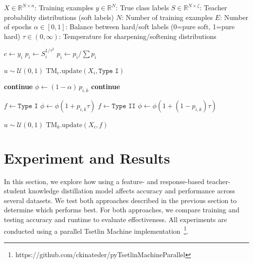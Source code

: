 \documentclass[sn-mathphys-num]{sn-jnl}%
\theoremstyle{thmstyleone}%
\theoremstyle{thmstyletwo}%
\theoremstyle{thmstylethree}%
\begin{document}
\begin{algorithm}[htbp]
	\caption{Tsetlin Machine fit method using soft label distributions}
	\label{algo:fit-soft}
	\begin{algorithmic}[1]
		\Require $X\in\mathbb{R}^{N \times n}$: Training examples
		\Require $y\in\mathbb{R}^{N}$: True class labels
		\Require $S\in\mathbb{R}^{N \times \zeta}$: Teacher probability distributions (soft labels)
		\Require $N$: Number of training examples
		\Require $E$: Number of epochs
		\Require $\alpha \in [0,1]$: Balance between hard/soft labels (0=pure soft, 1=pure hard)
		\Require $\tau \in (0,\infty)$: Temperature for sharpening/softening distributions
		
		\State $c \gets y_i$ 
		\State $p_i \gets S_i^{1/\tau^2}$ 
		\State $p_i \gets p_i / \sum p_i$ 
		
		\State $u \sim \mathcal{U}(0,1)$
		\State $\text{TM}_c.\text{update}(X_i, \texttt{Type I})$
		\EndIf
		
		\State \textbf{continue}
		\EndIf
		\State $\phi \gets (1 - \alpha) \, p_{i,k}$ 
		 
		\State \textbf{continue}
		\EndIf
		
		\State $f \gets \texttt{Type I}$ 
		\State $\phi \gets \phi (1 + p_{i,k} \tau)$
		\Else
		\State $f \gets \texttt{Type II}$ 
		\State $\phi \gets \phi (1 + (1 - p_{i,k}) \tau)$
		\EndIf
		
		\State $u \sim \mathcal{U}(0,1)$ 
		\State $\text{TM}_k.\text{update}(X_i, f)$
		\EndIf
		\EndFor
		\EndFor
		\EndFor
		\EndFunction
	\end{algorithmic}
\end{algorithm}

\section{Experiment and Results}
In this section, we explore how using a feature- and response-based teacher-student knowledge distillation model affects accuracy and performance across several datasets. We test both approaches described in the previous section to determine which performs best. For both approaches, we compare training and testing accuracy and runtime to evaluate effectiveness. All experiments are conducted using a parallel Tsetlin Machine implementation~\footnote{https://github.com/ckinateder/pyTsetlinMachineParallel}. 
\end{document}
